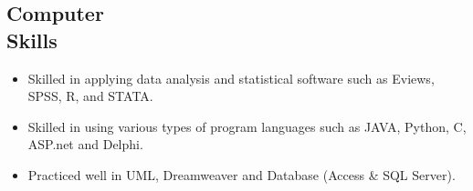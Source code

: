 \documentclass[11pt,margin,line]{res}
\newcommand{\bulletindent}{11pt}
\begin{document}
\begin{resume}
\section{Computer\\Skills}
	\begin{itemize}[leftmargin=\bulletindent]
	\item Skilled in applying data analysis and statistical software such as Eviews, SPSS, R, and STATA.
	\item Skilled in using various types of program languages such as JAVA, Python, C, ASP.net and Delphi.
	\item Practiced well in UML, Dreamweaver and Database (Access \& SQL Server).
	\end{itemize}
\end{resume}
\end{document}
